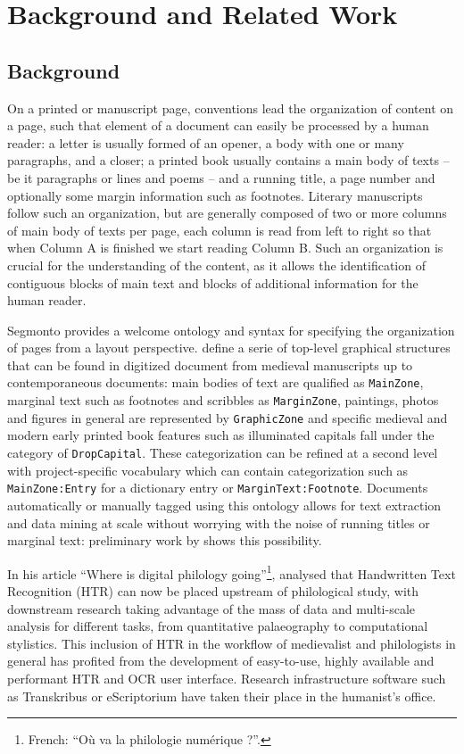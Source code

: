 \documentclass{jdmdh}
\begin{document}
\section{Background and Related Work}
\label{sec:related}

\subsection{Background}

On a printed or manuscript page, conventions lead the organization of content on a page, such that element of a document can easily be processed by a human reader: a letter is usually formed of an opener, a body with one or many paragraphs, and a closer; a printed book usually contains a main body of texts -- be it paragraphs or lines and poems -- and a running title, a page number and optionally some margin information such as footnotes. Literary manuscripts follow such an organization, but are generally composed of two or more columns of main body of texts per page, each column is read from left to right so that when Column A is finished we start reading Column B. Such an organization is crucial for the understanding of the content, as it allows the identification of contiguous blocks of main text and blocks of additional information for the human reader.

Segmonto provides a welcome ontology and syntax for specifying the organization of pages from a layout perspective. \citet{gabay2021segmonto} define a serie of top-level graphical structures that can be found in digitized document from medieval manuscripts up to contemporaneous documents: main bodies of text are qualified as \texttt{MainZone}, marginal text such as footnotes and scribbles as \texttt{MarginZone}, paintings, photos and figures in general are represented by \texttt{GraphicZone} and specific medieval and modern early printed book features such as illuminated capitals fall under the category of \texttt{DropCapital}. These categorization can be refined at a second level with project-specific vocabulary which can contain categorization such as \texttt{MainZone:Entry} for a dictionary entry or \texttt{MarginText:Footnote}. Documents automatically or manually tagged using this ontology allows for text extraction and data mining at scale without worrying with the noise of running titles or marginal text: preliminary work by \citet{christensen2022gallic} shows this possibility.

In his article ``Where is digital philology going''\footnote{French: ``Où va la philologie numérique ?''.}, \citet{camps2018o} analysed that Handwritten Text Recognition (HTR) can now be placed upstream of philological study, with downstream research taking advantage of the mass of data and multi-scale analysis for different tasks, from quantitative palaeography to computational stylistics. This inclusion of HTR in the workflow of medievalist and philologists in general has profited from the development of easy-to-use, highly available and performant HTR and OCR user interface. Research infrastructure software such as Transkribus \citep{kahle2017transkribus} or eScriptorium have taken their place in the humanist's office.
\end{document}
